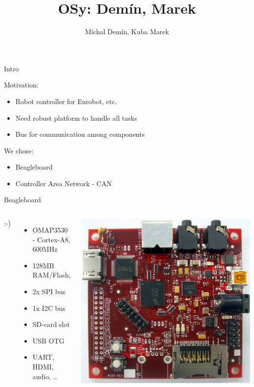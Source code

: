 \documentclass{beamer}
\title{OSy: Demín, Marek}
\author{Michal Demín, Kuba Marek}
\date{}
\begin{document}
\frame[plain]{\titlepage}

\begin{frame}{Intro}

Motivation:
\begin{itemize}
\item Robot controller for Eurobot, etc.
\item Need robust platform to handle all tasks
\item Bus for communication among components
\end{itemize}

We chose:
\begin{itemize}
\item Beagleboard
\item Controller Area Network - CAN
\end{itemize}
\end{frame}

\begin{frame}{Beagleboard}
\begin{columns}[c]

:-)
\begin{itemize}
\item OMAP3530 - Cortex-A8, 600MHz
\item 128MB RAM/Flash,
\item 2x SPI bus 
\item 1x I2C bus 
\item SD-card slot
\item USB OTG
\item UART, HDMI, audio, \ldots
\end{itemize}

\includegraphics[width=\textwidth]{../img/beagleboard}

\end{columns}
\end{frame}
\end{document}
